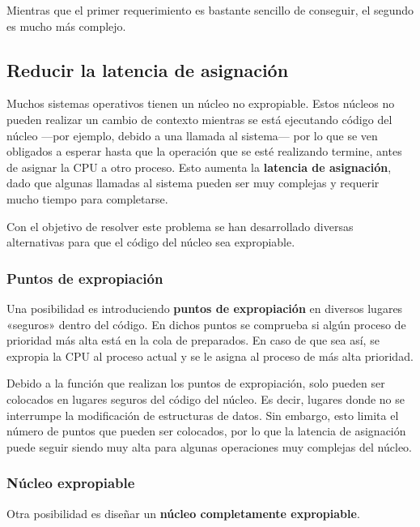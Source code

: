 Mientras que el primer requerimiento es bastante sencillo de conseguir,
el segundo es mucho más complejo.

\subsection{Reducir la latencia de
asignación}\label{_reducir_la_latencia_de_asignaciuxf3n}

Muchos sistemas operativos tienen un núcleo no expropiable. Estos
núcleos no pueden realizar un cambio de contexto mientras se está
ejecutando código del núcleo ---por ejemplo, debido a una llamada al
sistema--- por lo que se ven obligados a esperar hasta que la operación
que se esté realizando termine, antes de asignar la CPU a otro proceso.
Esto aumenta la \textbf{latencia de asignación}, dado que algunas
llamadas al sistema pueden ser muy complejas y requerir mucho tiempo
para completarse.

Con el objetivo de resolver este problema se han desarrollado diversas
alternativas para que el código del núcleo sea expropiable.

\subsubsection{Puntos de expropiación}\label{_puntos_de_expropiaciuxf3n}

Una posibilidad es introduciendo \textbf{puntos de expropiación}{} en
diversos lugares «seguros» dentro del código. En dichos puntos se
comprueba si algún proceso de prioridad más alta está en la cola de
preparados. En caso de que sea así, se expropia la CPU al proceso actual
y se le asigna al proceso de más alta prioridad.

Debido a la función que realizan los puntos de expropiación, solo pueden
ser colocados en lugares seguros del código del núcleo. Es decir,
lugares donde no se interrumpe la modificación de estructuras de datos.
Sin embargo, esto limita el número de puntos que pueden ser colocados,
por lo que la latencia de asignación puede seguir siendo muy alta para
algunas operaciones muy complejas del núcleo.

\subsubsection{Núcleo expropiable}\label{_nuxfacleo_expropiable}

Otra posibilidad es diseñar un \textbf{núcleo completamente
expropiable}.


